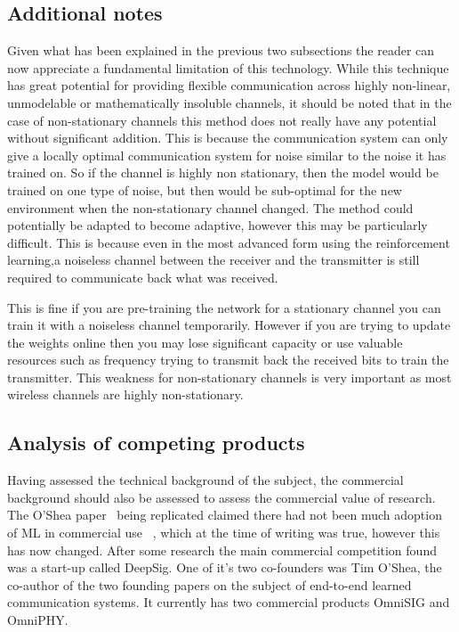 \documentclass[12pt,onecolumn,letterpaper]{article}
\begin{document}
\subsection{Additional notes}

Given what has been explained in the previous two subsections the reader can now appreciate a fundamental limitation of this technology. While this technique has great potential for providing flexible communication across highly non-linear, unmodelable or mathematically insoluble channels, it should be noted that in the case of non-stationary channels this method does not really have any potential without significant addition. This is because the communication system can only give a locally optimal communication system for noise similar to the noise it has trained on. So if the channel is highly non stationary, then the model would be trained on one type of noise, but then would be sub-optimal for the new environment when the non-stationary channel changed. The method could potentially be adapted to become adaptive, however this may be particularly difficult. This is because even in the most advanced form using the reinforcement learning,a noiseless channel between the receiver and the transmitter is still required to communicate back what was received. 

This is fine if you are pre-training the network for a stationary channel you can train it with a noiseless channel temporarily. However if you are trying to update the weights online then you may lose significant capacity or use valuable resources such as frequency trying to transmit back the received bits to train the transmitter. This weakness for non-stationary channels is very important as most wireless channels are highly non-stationary. 

\subsection{Analysis of competing products}

Having assessed the technical background of the subject, the commercial background should also be assessed to assess the commercial value of research. The O'Shea paper~\cite{oShea} being replicated claimed there had not been much adoption of ML in commercial use ~\cite{oShea}, which at the time of writing was true, however this has now changed. After some research the main commercial competition found was a start-up called DeepSig. One of it's two co-founders was Tim O'Shea, the co-author of the two founding papers on the subject of end-to-end learned communication systems. It currently has two commercial products OmniSIG and OmniPHY.
\end{document}
